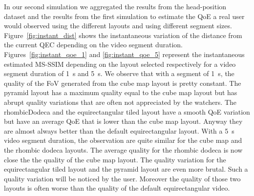 In our second simulation we aggregated the results from the
head-position dataset and the results from the first simulation to
estimate the \ac{QoE} a real user would  observed using the different
layouts and using different segment sizes.
Figure~\ref{fig:instant_dist} shows the instantaneous variation of the
distance from the current \ac{QEC} depending on the video segment
duration. Figures~\ref{fig:instant_qoe_1} and \ref{fig:instant_qoe_5}
represent the instantaneous estimated \ac{MS-SSIM} depending on the
layout selected respectively for a video segment duration of
\SI{1}{\second} and \SI{5}{\second}. We observe that with a segment of
\SI{1}{\second}, the quality of the \ac{FoV} generated from the cube
map layout is pretty constant. The pyramid layout has a maximum
quality equal to the cube map layout but has abrupt quality variations
that are often not appreciated by the watchers. The rhombicDodeca and
the equirectangular tiled layout have a smooth \ac{QoE} variation but
have an average \ac{QoE} that is lower than the cube map layout.
Anyway they are almost always better than the default equirectangular
layout. With a \SI{5}{\second} video segment duration, the observation
are quite similar for the cube map and the rhombic dodeca layouts. The
average quality for the rhombic dodeca is now close the the quality of
the cube map layout. The quality variation for the equirectangular
tiled layout and the pyramid layout are even more brutal. Such a
quality variation will be noticed by the user. Moreover the quality of
those two layouts is often worse than the quality of the default
equirectangular video.
